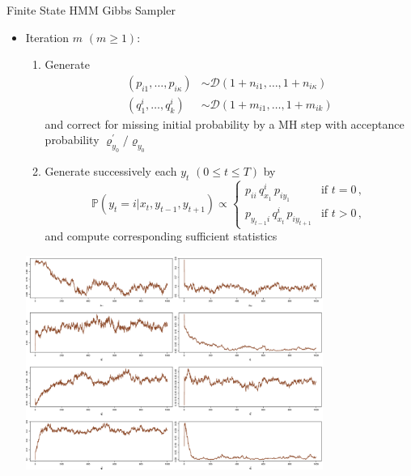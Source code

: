 \begin{slide}
\small
\begin{block}{Finite State HMM Gibbs Sampler}
\begin{itemize}
\item[]  {\sffamily Iteration $m$ $(m\ge 1)$:}
\begin{enumerate}
\item Generate
\begin{align*}
(p_{i1},\ldots,p_{i\kappa}) &\sim \mathscr{D}(1+n_{i1},\ldots,1+n_{i\kappa})\nonumber\\
(q^i_1,\ldots,q^i_k) &\sim \mathscr{D}(1+m_{i1},\ldots,1+m_{ik})\nonumber
\end{align*}
and correct for missing initial probability by a MH step with
acceptance probability $\varrho^\prime_{y_0}/\varrho_{y_0}$
\item Generate successively each $y_t$ $(0\le t\le T)$ by
$$
\mathbb{P}(y_t=i|x_t,y_{t-1},y_{t+1}) \propto \begin{cases}
    p_{ii}\,q^i_{x_1}\,p_{i y_1}            &\text{if } t=0\,,\\
    p_{y_{t-1}i}\,q^i_{x_t}\,p_{i y_{t+1}}  &\text{if } t>0\,,
    \end{cases}
$$
and compute corresponding sufficient statistics
\end{enumerate}\end{itemize}
\end{block}\normalsize

\end{slide}\begin{slide}

\centerline{\includegraphics[height=7cm,width=11cm]{figures/GigHmHi.eps}}

\end{slide}\begin{slide}


\end{slide}
